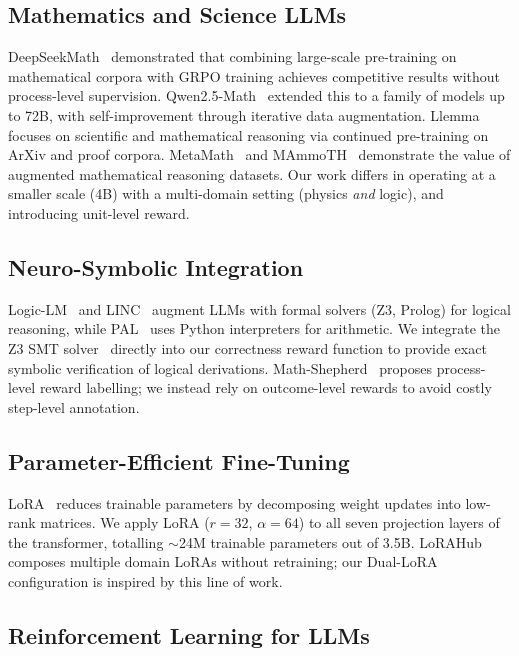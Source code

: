 \documentclass{ieeeaccess}
\begin{document}
\subsection{Mathematics and Science LLMs}

DeepSeekMath~\cite{Shao2024} demonstrated that combining large-scale
pre-training on mathematical corpora with GRPO training achieves
competitive results without process-level supervision.
Qwen2.5-Math~\cite{Yang2024} extended this to a family of models up to 72B,
with self-improvement through iterative data augmentation.
Llemma~\cite{Azerbayev2024} focuses on scientific and mathematical reasoning
via continued pre-training on ArXiv and proof corpora.
MetaMath~\cite{Yu2023} and MAmmoTH~\cite{Yue2023} demonstrate the value
of augmented mathematical reasoning datasets.
Our work differs in operating at a smaller scale (4B) with a multi-domain
setting (physics \emph{and} logic), and introducing unit-level reward.

\subsection{Neuro-Symbolic Integration}

Logic-LM~\cite{Pan2023} and LINC~\cite{Olausson2023} augment LLMs with
formal solvers (Z3, Prolog) for logical reasoning, while PAL~\cite{Gao2022}
uses Python interpreters for arithmetic.
We integrate the Z3 SMT solver~\cite{Pan2023} directly into our correctness
reward function to provide exact symbolic verification of logical derivations.
Math-Shepherd~\cite{Wang2024mathshepherd} proposes process-level reward
labelling; we instead rely on outcome-level rewards to avoid costly
step-level annotation.

\subsection{Parameter-Efficient Fine-Tuning}

LoRA~\cite{Hu2022} reduces trainable parameters by decomposing weight updates
into low-rank matrices.
We apply LoRA ($r=32$, $\alpha=64$) to all seven projection layers of the
transformer, totalling $\sim$24M trainable parameters out of 3.5B.
LoRAHub~\cite{Huang2023} composes multiple domain LoRAs without retraining;
our Dual-LoRA configuration is inspired by this line of work.

\subsection{Reinforcement Learning for LLMs}
\end{document}

